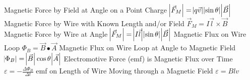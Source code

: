 \documentclass[11pt]{article}
\begin{document}
    Magnetic Force by Field at Angle on a Point Charge $\abs{\vec{F}_{M}} = \abs{q\vec{v}}\abs{\sin{\theta}}\abs{\vec{B}}$\newline
    Magnetic Force by Wire with Known Length and/or Field $\vec{F}_{M} = I\vec{l} \times \vec{B}$\newline
    Magnetic Force by Wire at Angle $\abs{\vec{F}_{M}} = \abs{I\vec{l}}\abs{\sin{\theta}}\abs{\vec{B}}$\newline
    Magnetic Flux on Wire Loop $\Phi_{B} = \vec{B}\bullet\vec{A}$\newline
    Magnetic Flux on Wire Loop at Angle to Magnetic Field $\abs{\Phi_{B}} = \abs{\vec{B}}\cos{\theta}\abs{\vec{A}}$\newline
    Electromotive Force (emf) is Magnetic Flux over Time $\varepsilon = -\frac{\Delta\Phi_{B}}{\Delta t}$\newline
    emf on Length of Wire Moving through a Magnetic Field $\varepsilon = Blv$
\end{document}

